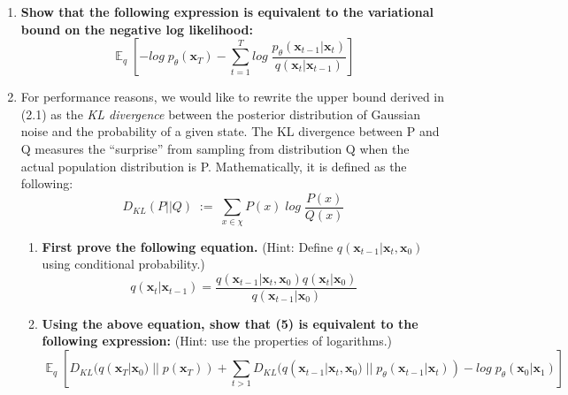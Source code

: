 \documentclass{article}
\DeclareMathOperator{\EX}{\mathbb{E}}%
\begin{document}
\begin{enumerate}
\item
\textbf{Show that the following expression is equivalent to the variational bound on the negative log likelihood:}
\begin{equation}
    \EX_q\left[-log \; p_{\theta}(\textbf{x}_T) - \sum_{t=1}^{T} log\;\frac{p_{\theta}(\textbf{x}_{t-1}|\textbf{x}_t)}{q(\textbf{x}_t|\textbf{x}_{t-1})} \right]
\end{equation}
\item
For performance reasons, we would like to rewrite the upper bound derived in (2.1) as the \textit{KL divergence} between the posterior distribution of Gaussian noise and the probability of a given state. The KL divergence between P and Q measures the ``surprise'' from sampling from distribution Q when the actual population distribution is P. Mathematically, it is defined as the following:
\begin{equation}
    D_{KL}(P||Q) \; := \;\sum_{x\in\chi}P(x)\;log\;\frac{P(x)}{Q(x)}
\end{equation}

\begin{enumerate}
\item
\textbf{First prove the following equation.}
(Hint: Define $q(\textbf{x}_{t-1}|\textbf{x}_t, \textbf{x}_0)$ using conditional probability.)
\begin{equation}
    q(\textbf{x}_t|\textbf{x}_{t-1}) = \frac{q(\textbf{x}_{t-1}|\textbf{x}_t, \textbf{x}_0) q(\textbf{x}_t|\textbf{x}_0)}{q(\textbf{x}_{t-1}|\textbf{x}_0)}
\end{equation}


\item
\textbf{Using the above equation, show that (5) is equivalent to the following expression:}
(Hint: use the properties of logarithms.)
\begin{equation}
    \EX_q[D_{KL}(q(\textbf{x}_T|\textbf{x}_0) \; || \; p(\textbf{x}_T)) + \sum_{t>1}D_{KL}(q(\textbf{x}_{t-1}|\textbf{x}_t, \textbf{x}_0)\;||\;p_{\theta}(\textbf{x}_{t-1} | \textbf{x}_t)) - log \;p_{\theta}(\textbf{x}_0 | \textbf{x}_1)]
\end{equation}

\end{enumerate}

\end{enumerate}
\end{document}
